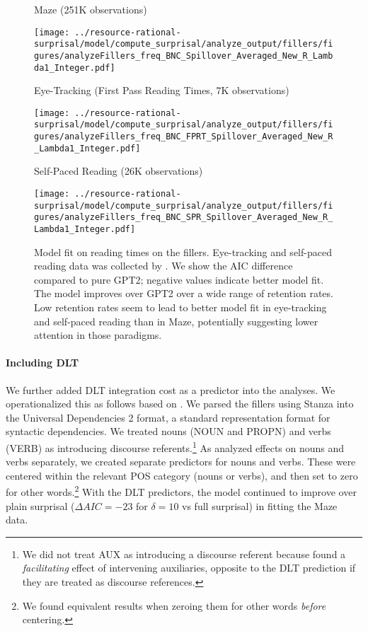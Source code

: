 \begin{figure}
	\centering

	Maze (251K observations) 

    \texttt{[image: ../resource-rational-surprisal/model/compute\_surprisal/analyze\_output/fillers/figures/analyzeFillers\_freq\_BNC\_Spillover\_Averaged\_New\_R\_Lambda1\_Integer.pdf]}

	Eye-Tracking (First Pass Reading Times, 7K observations) 

    \texttt{[image: ../resource-rational-surprisal/model/compute\_surprisal/analyze\_output/fillers/figures/analyzeFillers\_freq\_BNC\_FPRT\_Spillover\_Averaged\_New\_R\_Lambda1\_Integer.pdf]}

	Self-Paced Reading (26K observations) 

    \texttt{[image: ../resource-rational-surprisal/model/compute\_surprisal/analyze\_output/fillers/figures/analyzeFillers\_freq\_BNC\_SPR\_Spillover\_Averaged\_New\_R\_Lambda1\_Integer.pdf]}


	\caption{Model fit on reading times on the fillers. Eye-tracking and self-paced reading data was collected by \cite{vasishth2010short}. We show the AIC difference compared to pure GPT2; negative values indicate better model fit. The model improves over GPT2 over a wide range of retention rates. Low retention rates seem to lead to better model fit in eye-tracking and self-paced reading than in Maze, potentially suggesting lower attention in those paradigms. 
	}\label{figure:fillers-fit}
\end{figure}


\paragraph{Including DLT}
We further added DLT integration cost as a predictor into the analyses.
We operationalized this as follows based on \citet{Demberg2008DataFE}.
We parsed the fillers using Stanza \citep{Qi2020StanzaAP} into the Universal Dependencies 2 format, a standard representation format for syntactic dependencies.
We treated nouns (NOUN and PROPN) and verbs (VERB) as introducing discourse referents.\footnote{We did not treat AUX as introducing a discourse referent because \citet{Demberg2008DataFE} found a \emph{facilitating} effect of intervening auxiliaries, opposite to the DLT prediction if they are treated as discourse references.}
As \citet{Demberg2008DataFE} analyzed effects on nouns and verbs separately, we created separate predictors for nouns and verbs. These were centered within the relevant POS category (nouns or verbs), and then set to zero for other words.\footnote{We found equivalent results when zeroing them for other words \emph{before} centering.}
With the DLT predictors, the model continued to improve over plain surprisal ($\Delta AIC = -23$ for $\delta=10$ vs full surprisal) in fitting the Maze data.

